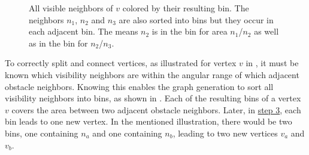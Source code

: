 			\begin{figure}[h]
				\begin{figcenter}
				\end{figcenter}
				\caption{All visible neighbors of $v$ colored by their resulting bin. The neighbors $n_1$, $n_2$ and $n_3$ are also sorted into bins but they occur in each adjacent bin. The means $n_2$ is in the bin for area $n_1$/$n_2$ as well as in the bin for $n_2$/$n_3$.}
				\label{fig:visibility-bin-sorting}
			\end{figure}
			
			To correctly split and connect vertices, as illustrated for vertex $v$ in , it must be known which visibility neighbors are within the angular range of which adjacent obstacle neighbors.
			Knowing this enables the graph generation to sort all visibility neighbors into bins, as shown in .
			Each of the resulting bins of a vertex $v$ covers the area between two adjacent obstacle neighbors.
			Later, in \hyperref[subsec:step-3-graph-creation]{step 3}, each bin leads to one new vertex.
			In the mentioned illustration, there would be two bins, one containing $n_a$ and one containing $n_b$, leading to two new vertices $v_a$ and $v_b$.
			
